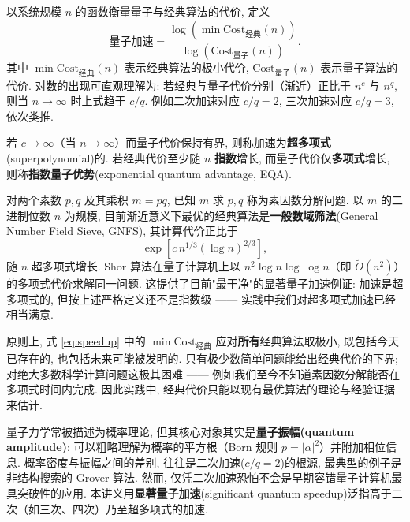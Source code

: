 \documentclass[utf8]{article} %
\numberwithin{equation}{section}   %
\newtheorem{Def}{\hskip 2em {\color{green} 定义}}[subsection]
\newtheorem{Note}{\hskip 2em {\color{red} 注}}[subsection]
\newtheorem{Eg}{\hskip 2em {\color{black} 例}}[subsection]
\begin{document}
\begin{Def}[量子加速]
    以系统规模 $n$ 的函数衡量量子与经典算法的代价, 定义
    \begin{equation}
        \text{量子加速} = \frac{\log\left(\min \mathrm{Cost}_{\text{经典}}(n)\right)}{\log\left(\mathrm{Cost}_{\text{量子}}(n)\right)}.
        \label{eq:speedup}
    \end{equation}
    其中 $\min \mathrm{Cost}_{\text{经典}}(n)$ 表示经典算法的极小代价, $\mathrm{Cost}_{\text{量子}}(n)$ 表示量子算法的代价. 对数的出现可直观理解为: 若经典与量子代价分别（渐近）正比于 $n^c$ 与 $n^q$, 则当 $n \to \infty$ 时上式趋于 $c/q$. 例如二次加速对应 $c/q = 2$, 三次加速对应 $c/q = 3$, 依次类推.
\end{Def}

\begin{Def}[超多项式加速与指数量子优势]
    若 $c \to \infty$（当 $n \to \infty$）而量子代价保持有界, 则称加速为\textbf{超多项式}(superpolynomial)的. 若经典代价至少随 $n$ \textbf{指数}增长, 而量子代价仅\textbf{多项式}增长, 则称\textbf{指数量子优势}(exponential quantum advantage, EQA).
\end{Def}

\begin{Eg}[素因数分解]
    对两个素数 $p, q$ 及其乘积 $m = pq$, 已知 $m$ 求 $p, q$ 称为素因数分解问题. 以 $m$ 的二进制位数 $n$ 为规模, 目前渐近意义下最优的经典算法是\textbf{一般数域筛法}(General Number Field Sieve, GNFS), 其计算代价正比于
    \[
        \exp\left[c\, n^{1/3} (\log n)^{2/3}\right],
    \]
    随 $n$ 超多项式增长. Shor 算法在量子计算机上以 $n^2 \log n \log\log n$（即 $\tilde O(n^2)$）的多项式代价求解同一问题. 这提供了目前"最干净"的显著量子加速例证: 加速是超多项式的, 但按上述严格定义还不是指数级 —— 实践中我们对超多项式加速已经相当满意.
\end{Eg}

\begin{Note}[关于经典代价的极小化]
    原则上, 式 \eqref{eq:speedup} 中的 $\min \mathrm{Cost}_{\text{经典}}$ 应对\textbf{所有}经典算法取极小, 既包括今天已存在的, 也包括未来可能被发明的. 只有极少数简单问题能给出经典代价的下界; 对绝大多数科学计算问题这极其困难 —— 例如我们至今不知道素因数分解能否在多项式时间内完成. 因此实践中, 经典代价只能以现有最优算法的理论与经验证据来估计.
\end{Note}

\begin{Note}
    量子力学常被描述为概率理论, 但其核心对象其实是\textbf{量子振幅(quantum amplitude)}: 可以粗略理解为概率的平方根（Born 规则 $p=|\alpha|^2$）并附加相位信息. 概率密度与振幅之间的差别, 往往是二次加速($c/q = 2$)的根源, 最典型的例子是非结构搜索的 Grover 算法. 然而, 仅凭二次加速恐怕不会是早期容错量子计算机最具突破性的应用. 本讲义用\textbf{显著量子加速}(significant quantum speedup)泛指高于二次（如三次、四次）乃至超多项式的加速.
\end{Note}
\end{document}

